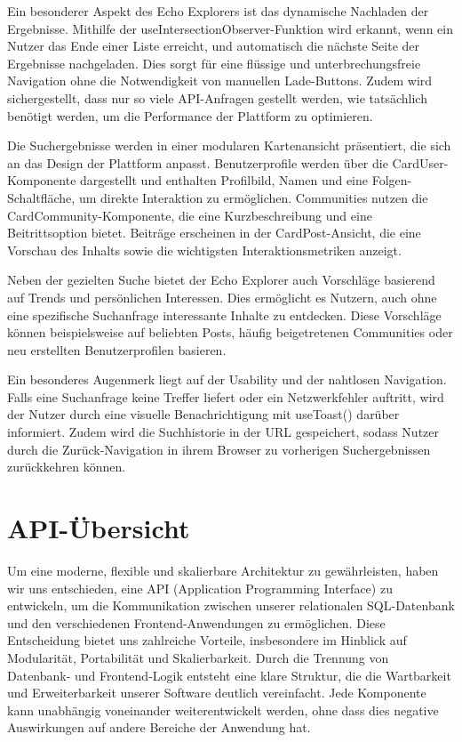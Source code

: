 \documentclass[a4paper,12pt]{article}
\begin{document}
Ein besonderer Aspekt des Echo Explorers ist das dynamische Nachladen der
Ergebnisse. Mithilfe der useIntersectionObserver-Funktion wird erkannt, wenn
ein Nutzer das Ende einer Liste erreicht, und automatisch die nächste Seite der
Ergebnisse nachgeladen. Dies sorgt für eine flüssige und unterbrechungsfreie
Navigation ohne die Notwendigkeit von manuellen Lade-Buttons. Zudem wird
sichergestellt, dass nur so viele API-Anfragen gestellt werden, wie tatsächlich
benötigt werden, um die Performance der Plattform zu optimieren.

Die Suchergebnisse werden in einer modularen Kartenansicht präsentiert, die
sich an das Design der Plattform anpasst. Benutzerprofile werden über die
CardUser-Komponente dargestellt und enthalten Profilbild, Namen und eine
Folgen-Schaltfläche, um direkte Interaktion zu ermöglichen. Communities nutzen
die CardCommunity-Komponente, die eine Kurzbeschreibung und eine
Beitrittsoption bietet. Beiträge erscheinen in der CardPost-Ansicht, die eine
Vorschau des Inhalts sowie die wichtigsten Interaktionsmetriken anzeigt.

Neben der gezielten Suche bietet der Echo Explorer auch Vorschläge basierend
auf Trends und persönlichen Interessen. Dies ermöglicht es Nutzern, auch ohne
eine spezifische Suchanfrage interessante Inhalte zu entdecken. Diese
Vorschläge können beispielsweise auf beliebten Posts, häufig beigetretenen
Communities oder neu erstellten Benutzerprofilen basieren.

Ein besonderes Augenmerk liegt auf der Usability und der nahtlosen Navigation.
Falls eine Suchanfrage keine Treffer liefert oder ein Netzwerkfehler auftritt,
wird der Nutzer durch eine visuelle Benachrichtigung mit useToast() darüber
informiert. Zudem wird die Suchhistorie in der URL gespeichert, sodass Nutzer
durch die Zurück-Navigation in ihrem Browser zu vorherigen Suchergebnissen
zurückkehren können.

\newpage
\section{API-Übersicht}

Um eine moderne, flexible und skalierbare Architektur zu gewährleisten, haben
wir uns entschieden, eine API (Application Programming Interface) zu
entwickeln, um die Kommunikation zwischen unserer relationalen SQL-Datenbank
und den verschiedenen Frontend-Anwendungen zu ermöglichen. Diese Entscheidung
bietet uns zahlreiche Vorteile, insbesondere im Hinblick auf Modularität,
Portabilität und Skalierbarkeit. Durch die Trennung von Datenbank- und
Frontend-Logik entsteht eine klare Struktur, die die Wartbarkeit und
Erweiterbarkeit unserer Software deutlich vereinfacht. Jede Komponente kann
unabhängig voneinander weiterentwickelt werden, ohne dass dies negative
Auswirkungen auf andere Bereiche der Anwendung hat.
\end{document}
